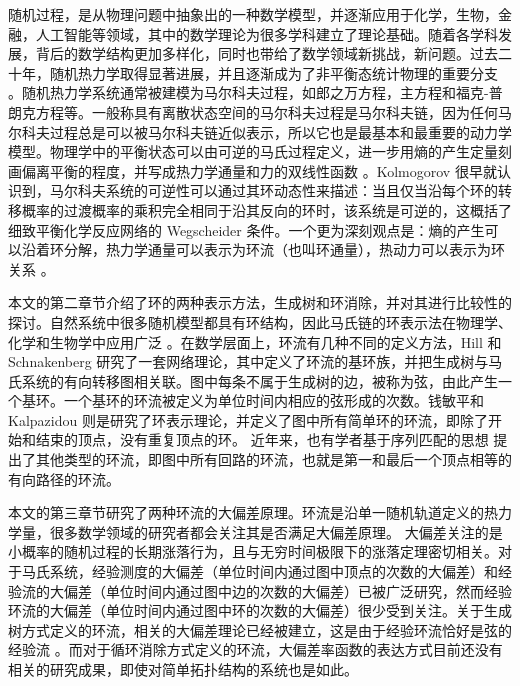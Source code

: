 

随机过程，是从物理问题中抽象出的一种数学模型，并逐渐应用于化学，生物，金融，人工智能等领域，其中的数学理论为很多学科建立了理论基础。随着各学科发展，背后的数学结构更加多样化，同时也带给了数学领域新挑战，新问题。过去二十年，随机热力学取得显著进展，并且逐渐成为了非平衡态统计物理的重要分支 \cite{annurev-conmatphys,Seifert_2012,VANDENBROECK20156} 。随机热力学系统通常被建模为马尔科夫过程，如郎之万方程，主方程和福克-普朗克方程等。一般称具有离散状态空间的马尔科夫过程是马尔科夫链，因为任何马尔科夫过程总是可以被马尔科夫链近似表示，所以它也是最基本和最重要的动力学模型。物理学中的平衡状态可以由可逆的马氏过程定义，进一步用熵的产生定量刻画偏离平衡的程度，并写成热力学通量和力的双线性函数 \cite{PhysRev.91.1505}。Kolmogorov \cite{Math.Ann.112} 很早就认识到，马尔科夫系统的可逆性可以通过其环动态性来描述：当且仅当沿每个环的转移概率的过渡概率的乘积完全相同于沿其反向的环时，该系统是可逆的，这概括了细致平衡化学反应网络的 Wegscheider 条件。一个更为深刻观点是：熵的产生可以沿着环分解，热力学通量可以表示为环流（也叫环通量），热动力可以表示为环关系 \cite{Schnakenberg1976NetworkTO}。

本文的第二章节介绍了环的两种表示方法，生成树和环消除，并对其进行比较性的探讨。自然系统中很多随机模型都具有环结构，因此马氏链的环表示法在物理学、化学和生物学中应用广泛 \cite{ZHANG20121,GE201287}。在数学层面上，环流有几种不同的定义方法，Hill \cite{Hill1966StudiesIIa,Hill1966StudiesIIb,hill2013free} 和 Schnakenberg \cite{Schnakenberg1976NetworkTO} 研究了一套网络理论，其中定义了环流的基环族，并把生成树与马氏系统的有向转移图相关联。图中每条不属于生成树的边，被称为弦，由此产生一个基环。一个基环的环流被定义为单位时间内相应的弦形成的次数。钱敏平\cite{minping1982circulation,jian1984circulations,jiang2004mathematical}和 Kalpazidou \cite{kalpazidou2007cycle} 则是研究了环表示理论，并定义了图中所有简单环的环流，即除了开始和结束的顶点，没有重复顶点的环。
近年来，也有学者基于序列匹配的思想 \cite{roldan2019exact,biddle2020reversal,pietzonka2021cycle} 提出了其他类型的环流，即图中所有回路的环流，也就是第一和最后一个顶点相等的有向路径的环流。

本文的第三章节研究了两种环流的大偏差原理。环流是沿单一随机轨道定义的热力学量，很多数学领域的研究者都会关注其是否满足大偏差原理\cite{varadhan1984large,den2000large}。
大偏差关注的是小概率的随机过程的长期涨落行为，且与无穷时间极限下的涨落定理密切相关。对于马氏系统，经验测度的大偏差（单位时间内通过图中顶点的次数的大偏差）和经验流的大偏差（单位时间内通过图中边的次数的大偏差）已被广泛研究，然而经验环流的大偏差（单位时间内通过图中环的次数的大偏差）很少受到关注。关于生成树方式定义的环流，相关的大偏差理论已经被建立，这是由于经验环流恰好是弦的经验流 \cite{bertini2015flows,bertini2015large}。而对于循环消除方式定义的环流，大偏差率函数的表达方式目前还没有相关的研究成果，即使对简单拓扑结构的系统也是如此。

